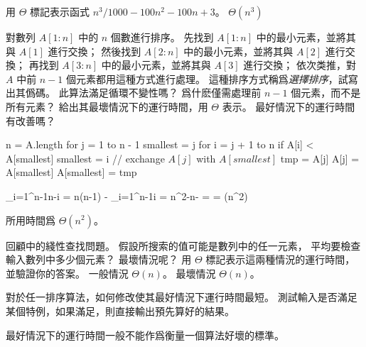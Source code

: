 \startsection[
  title={Analyzing algorithms},
]

\startEXERCISE
用 $\Theta$ 標記表示函式 $n^3 / 1000 - 100 n^2 - 100 n + 3$。
\stopEXERCISE
\startANSWER
$\Theta(n^3)$
\stopANSWER

對數列 $A[1:n]$ 中的 $n$ 個數進行排序。
先找到 $A[1:n]$ 中的最小元素，並將其與 $A[1]$ 進行交換；
然後找到 $A[2:n]$ 中的最小元素，並將其與 $A[2]$ 進行交換；
再找到 $A[3:n]$ 中的最小元素，並將其與 $A[3]$ 進行交換；
依次类推，對 $A$ 中前 $n-1$ 個元素都用這種方式進行處理。
這種排序方式稱爲\emph{選擇排序}，試寫出其僞碼。
此算法滿足循環不變性嗎？
爲什麽僅需處理前 $n-1$ 個元素，而不是所有元素？
給出其最壞情況下的運行時間，用 $\Theta$ 表示。
最好情況下的運行時間有改善嗎？
\stopEXERCISE

\startANSWER
\startCLRSCODE
n = A.length
for j = 1 to n - 1
	smallest = j
	for i = j + 1 to n
		if A[i] < A[smallest]
			smallest = i
	// exchange $A[j]$ with $A[smallest]$
	tmp = A[j]
	A[j] = A[smallest]
	A[smallest] = tmp
\stopCLRSCODE

\startformula
\startmathalignment[n=2]
\NC \NC\sum_{i=1}^{n-1}n-i \NR
\NC = \NC n(n-1) - \sum_{i=1}^{n-1}i \NR
\NC = \NC n^2-n- \NR
\NC = \NC {} \NR
\NC = \NC \Theta(n^2) \NR
\stopmathalignment
\stopformula

所用時間爲 $\Theta(n^2)$。
\stopANSWER

\startEXERCISE
回顧中的綫性查找問題。
假設所搜索的值可能是數列中的任一元素，
平均要檢查輸入數列中多少個元素？
最壞情況呢？
用 $\Theta$ 標記表示這兩種情況的運行時間，
並驗證你的答案。
\stopEXERCISE
\startANSWER
一般情況 $\Theta(n)$。
最壞情況 $\Theta(n)$。
\stopANSWER

\startEXERCISE
對於任一排序算法，如何修改使其最好情況下運行時間最短。
\stopEXERCISE
\startANSWER
測試輸入是否滿足某個特例，如果滿足，則直接輸出預先算好的結果。

最好情況下的運行時間一般不能作爲衡量一個算法好壞的標準。
\stopANSWER

\stopsection
